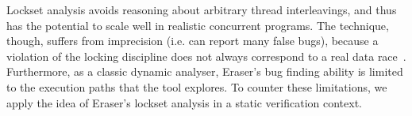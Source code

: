 Lockset analysis avoids reasoning about arbitrary thread interleavings, and thus has the potential to scale well in realistic concurrent programs. The technique, though, suffers from imprecision (i.e. can report many false bugs), because a violation of the locking discipline does not always correspond to a real data race~\cite{savage1997eraser, pozniansky2003efficient, o2003hybrid, elmas2007goldilocks, flanagan2009fasttrack}. Furthermore, as a classic dynamic analyser, Eraser's bug finding ability is limited to the execution paths that the tool explores. To counter these limitations, we apply the idea of Eraser's lockset analysis in a static verification context.